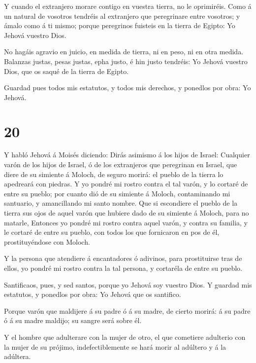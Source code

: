  Y cuando el extranjero morare contigo en vuestra tierra,
no le oprimiréis.  Como á un natural de vosotros tendréis
al extranjero que peregrinare entre vosotros; y ámalo como á ti mismo;
porque peregrinos fuisteis en la tierra de Egipto: Yo Jehová vuestro
Dios.

 No hagáis agravio en juicio, en medida de tierra, ni en
peso, ni en otra medida.  Balanzas justas, pesas justas,
epha justo, é hin justo tendréis: Yo Jehová vuestro Dios, que os saqué
de la tierra de Egipto.

 Guardad pues todos mis estatutos, y todos mis derechos, y
ponedlos por obra: Yo Jehová.

\hypertarget{section-19}{%
\section{20}\label{section-19}}

 Y habló Jehová á Moisés diciendo:  Dirás
asimismo á los hijos de Israel: Cualquier varón de los hijos de Israel,
ó de los extranjeros que peregrinan en Israel, que diere de su simiente
á Moloch, de seguro morirá: el pueblo de la tierra lo apedreará con
piedras.  Y yo pondré mi rostro contra el tal varón, y lo
cortaré de entre su pueblo; por cuanto dió de su simiente á Moloch,
contaminando mi santuario, y amancillando mi santo nombre. 
Que si escondiere el pueblo de la tierra sus ojos de aquel varón que
hubiere dado de su simiente á Moloch, para no matarle, 
Entonces yo pondré mi rostro contra aquel varón, y contra su familia, y
le cortaré de entre su pueblo, con todos los que fornicaron en pos de
él, prostituyéndose con Moloch.

 Y la persona que atendiere á encantadores ó adivinos, para
prostituirse tras de ellos, yo pondré mi rostro contra la tal persona, y
cortaréla de entre su pueblo.

 Santificaos, pues, y sed santos, porque yo Jehová soy
vuestro Dios.  Y guardad mis estatutos, y ponedlos por obra:
Yo Jehová que os santifico.

 Porque varón que maldijere á su padre ó á su madre, de
cierto morirá: á su padre ó á su madre maldijo; su sangre será sobre él.

 Y el hombre que adulterare con la mujer de otro, el que
cometiere adulterio con la mujer de su prójimo, indefectiblemente se
hará morir al adúltero y á la adúltera.

